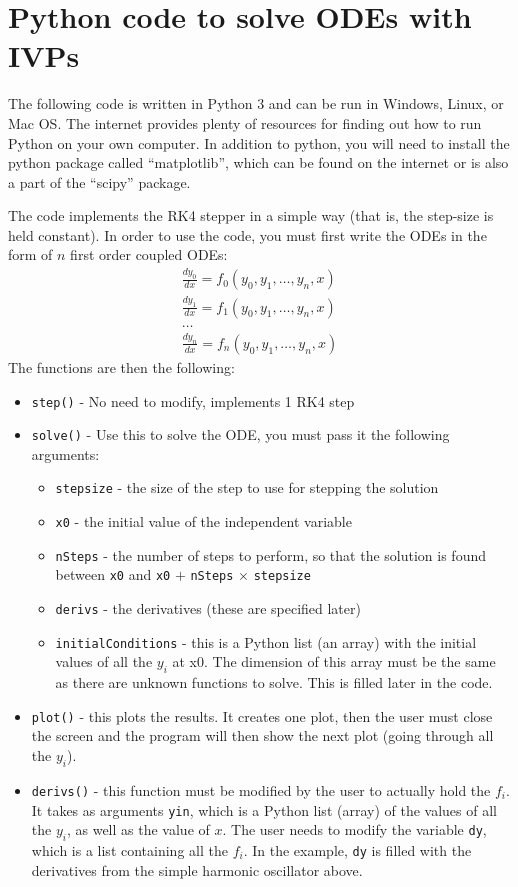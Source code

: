 \section{Python code to solve ODEs with IVPs}
The following code is written in Python 3 and can be run in Windows, Linux, or Mac OS. The internet provides plenty of resources for finding out how to run Python on your own computer. In addition to python, you will need to install the python package called ``matplotlib'', which can be found on the internet or is also a part of the ``scipy'' package.

The code implements the RK4 stepper in a simple way (that is, the step-size is held constant). In order to use the code, you must first write the ODEs in the form of $n$ first order coupled ODEs:
\begin{align}
\frac{dy_0}{dx}=f_0(y_0,y_1,\dots ,y_n,x)\nonumber\\
\frac{dy_1}{dx}=f_1(y_0,y_1,\dots ,y_n,x)\nonumber\\
\dots\nonumber\\
\frac{dy_n}{dx}=f_n(y_0,y_1,\dots ,y_n,x)\nonumber
\end{align}
The functions are then the following:
\begin{itemize}
\item \texttt{step()} - No need to modify, implements 1 RK4 step
\item \texttt{solve()} - Use this to solve the ODE, you must pass it the following arguments:
\begin{itemize}
\item \texttt{stepsize} - the size of the step to use for stepping the solution
\item \texttt{x0} - the initial value of the independent variable
\item \texttt{nSteps} - the number of steps to perform, so that the solution is found between \texttt{x0} and \texttt{x0} $+$ \texttt{nSteps} $\times$ \texttt{stepsize}
\item \texttt{derivs} - the derivatives (these are specified later)
\item \texttt{initialConditions} - this is a Python list (an array) with the initial values of all the $y_i$ at x0. The dimension of this array must be the same as there are unknown functions to solve. This is filled later in the code.
\end{itemize}
\item \texttt{plot()} - this plots the results. It creates one plot, then the user must close the screen and the program will then show the next plot (going through all the $y_i$).
\item \texttt{derivs()} - this function must be modified by the user to actually hold the $f_i$. It takes as arguments \texttt{yin}, which is a Python list (array) of the values of all the $y_i$, as well as the value of $x$. The user needs to modify the variable \texttt{dy}, which is a list containing all the $f_i$. In the example, \texttt{dy} is filled with the derivatives from the simple harmonic oscillator above.
\end{itemize}
